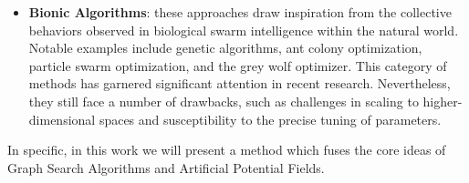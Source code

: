 \begin{itemize}
    \item \textbf{Bionic Algorithms}: these approaches draw inspiration from the collective behaviors observed in biological swarm intelligence within the natural world. Notable examples include genetic algorithms, ant colony optimization, particle swarm optimization, and the grey wolf optimizer. This category of methods has garnered significant attention in recent research. Nevertheless, they still face a number of drawbacks, such as challenges in scaling to higher-dimensional spaces and susceptibility to the precise tuning of parameters.
\end{itemize}
In specific, in this work we will present a method which fuses the core ideas of Graph Search Algorithms and Artificial Potential Fields.


